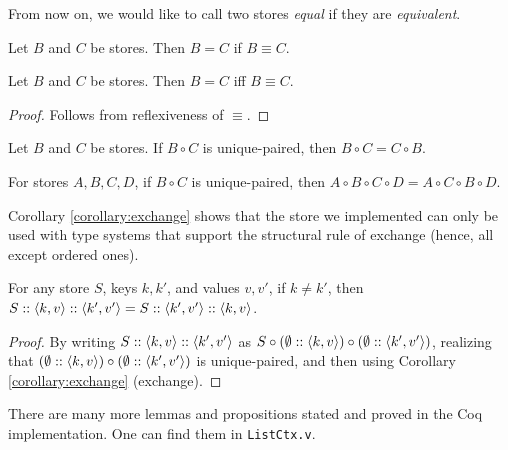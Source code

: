 From now on, we would like to call two stores \textit{equal} if they are \textit{equivalent}.

\begin{axiom}[Extensionality]
\label{axiom:extentionality}
Let $B$ and $C$ be stores. Then $B = C$ if $B \equiv C$.
\end{axiom}

\begin{corollary}
Let $B$ and $C$ be stores. Then $B = C$ iff $B \equiv C$.
\end{corollary}
\begin{proof}
Follows from reflexiveness of $\equiv$.
\end{proof}

\begin{theorem}[Commute]
\label{theorem:commute}
Let $B$ and $C$ be stores. If $B \circ C$ is unique-paired, then $B \circ C = C \circ B$.
\end{theorem}

\begin{corollary}[Exchange]
\label{corollary:exchange}
For stores $A, B, C, D$, if $B \circ C$ is unique-paired, then $A \circ B \circ C \circ D = A \circ C \circ B \circ D$.
\end{corollary}

Corollary \ref{corollary:exchange} shows that the store we implemented can only be used with type systems that support the structural rule of exchange (hence, all except ordered ones).

\begin{lemma}
\label{lemma:append_commut}
For any store $S$, keys $k, k'$, and values $v, v'$, if $k \not= k'$, then $S :: \left\langle k, v \right\rangle :: \left\langle k', v' \right\rangle = S :: \left\langle k', v' \right\rangle :: \left\langle k, v \right\rangle$.
\end{lemma}
\begin{proof}
By writing $S :: \left\langle k, v \right\rangle :: \left\langle k', v' \right\rangle$ as $S \circ (\emptyset :: \left\langle k, v \right\rangle) \circ (\emptyset :: \left\langle k', v' \right\rangle)$, realizing that $(\emptyset :: \left\langle k, v \right\rangle) \circ (\emptyset :: \left\langle k', v' \right\rangle)$ is unique-paired, and then using Corollary \ref{corollary:exchange} (exchange).
\end{proof}

There are many more lemmas and propositions stated and proved in the Coq implementation. One can find them in \texttt{ListCtx.v}.